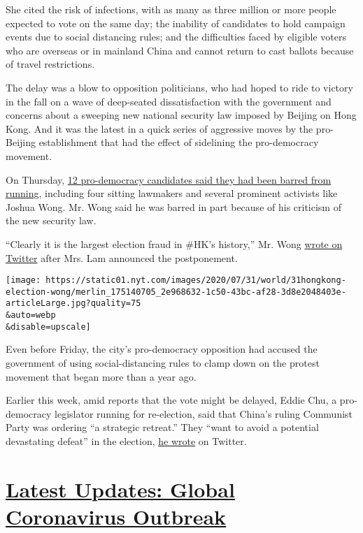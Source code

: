 She cited the risk of infections, with as many as three million or more
people expected to vote on the same day; the inability of candidates to
hold campaign events due to social distancing rules; and the
difficulties faced by eligible voters who are overseas or in mainland
China and cannot return to cast ballots because of travel restrictions.

The delay was a blow to opposition politicians, who had hoped to ride to
victory in the fall on a wave of deep-seated dissatisfaction with the
government and concerns about a sweeping new national security law
imposed by Beijing on Hong Kong. And it was the latest in a quick series
of aggressive moves by the pro-Beijing establishment that had the effect
of sidelining the pro-democracy movement.

On Thursday,
\href{https://www.nytimes.com/2020/07/29/world/asia/hong-kong-arrests-security-law.html}{12
pro-democracy candidates said they had been barred from running},
including four sitting lawmakers and several prominent activists like
Joshua Wong. Mr. Wong said he was barred in part because of his
criticism of the new security law.

``Clearly it is the largest election fraud in \#HK's history,'' Mr. Wong
\href{https://twitter.com/joshuawongcf/status/1289147160009887745}{wrote
on Twitter} after Mrs. Lam announced the postponement.

\texttt{[image: https://static01.nyt.com/images/2020/07/31/world/31hongkong-election-wong/merlin\_175140705\_2e968632-1c50-43bc-af28-3d8e2048403e-articleLarge.jpg?quality=75\\\&auto=webp\\\&disable=upscale]}

Even before Friday, the city's pro-democracy opposition had accused the
government of using social-distancing rules to clamp down on the protest
movement that began more than a year ago.

Earlier this week, amid reports that the vote might be delayed, Eddie
Chu, a pro-democracy legislator running for re-election, said that
China's ruling Communist Party was ordering ``a strategic retreat.''
They ``want to avoid a potential devastating defeat'' in the election,
\href{https://twitter.com/ChuHoiDick/status/1287939279302193157}{he
wrote} on Twitter.

\hypertarget{latest-updates-global-coronavirus-outbreak}{%
\section{\texorpdfstring{\href{https://www.nytimes.com/2020/08/01/world/coronavirus-covid-19.html?action=click\&pgtype=Article\&state=default\&region=MAIN_CONTENT_1\&context=storylines_live_updates}{Latest
Updates: Global Coronavirus
Outbreak}}{Latest Updates: Global Coronavirus Outbreak}}\label{latest-updates-global-coronavirus-outbreak}}

